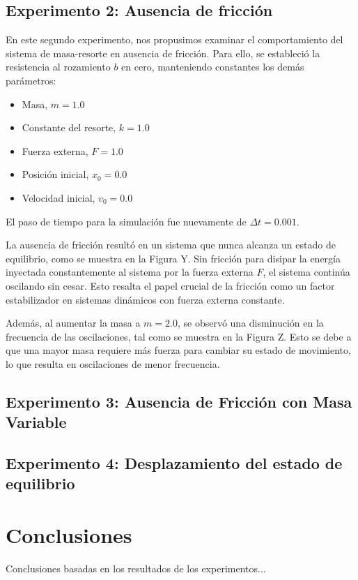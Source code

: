 \documentclass{article}
\begin{document}
\subsection{Experimento 2: Ausencia de fricción}
En este segundo experimento, nos propusimos examinar el comportamiento del sistema de masa-resorte en ausencia de fricción. Para ello, se estableció la resistencia al rozamiento $b$ en cero, manteniendo constantes los demás parámetros:

\begin{itemize}
\item Masa, $m = 1.0$
\item Constante del resorte, $k = 1.0$
\item Fuerza externa, $F = 1.0$
\item Posición inicial, $x_0 = 0.0$
\item Velocidad inicial, $v_0 = 0.0$
\end{itemize}

El paso de tiempo para la simulación fue nuevamente de $\Delta t= 0.001$.

La ausencia de fricción resultó en un sistema que nunca alcanza un estado de equilibrio, como se muestra en la Figura Y. Sin fricción para disipar la energía inyectada constantemente al sistema por la fuerza externa $F$, el sistema continúa oscilando sin cesar. Esto resalta el papel crucial de la fricción como un factor estabilizador en sistemas dinámicos con fuerza externa constante.

Además, al aumentar la masa a $m = 2.0$, se observó una disminución en la frecuencia de las oscilaciones, tal como se muestra en la Figura Z. Esto se debe a que una mayor masa requiere más fuerza para cambiar su estado de movimiento, lo que resulta en oscilaciones de menor frecuencia.



\subsection{Experimento 3: Ausencia de Fricción con Masa Variable}



\subsection{Experimento 4: Desplazamiento del estado de equilibrio}

\section{Conclusiones}
Conclusiones basadas en los resultados de los experimentos...
\end{document}

